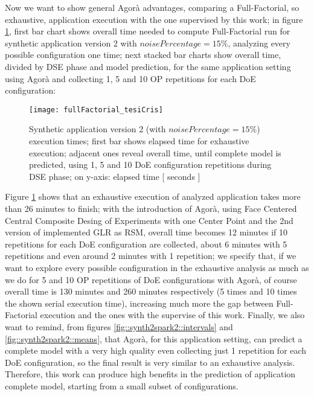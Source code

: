 Now we want to show general Agorà advantages, comparing a Full-Factorial, so exhaustive, application execution with the one supervised by this work; in figure \ref{fig::full_cris}, first bar chart shows overall time needed to compute Full-Factorial run for synthetic application version 2 with $noisePercentage = 15\%$, analyzing every possible configuration one time; next stacked bar charts show overall time, divided by DSE phase and model prediction, for the same application setting using Agorà and collecting 1, 5 and 10 OP repetitions for each DoE configuration:

\begin{figure}[h]

    \centering
    \texttt{[image: fullFactorial\_tesiCris]}
    \caption[Synthetic application version 2 execution times]{Synthetic application version 2 (with $noisePercentage = 15\%$) execution times; first bar shows elapsed time for exhaustive execution; adjacent ones reveal overall time, until complete model is predicted, using 1, 5 and 10 DoE configuration repetitions during DSE phase; on y-axis: elapsed time [ seconds ]}
    \label{fig::full_cris}
    
\end{figure}

Figure \ref{fig::full_cris} shows that an exhaustive execution of analyzed application takes more than 26 minutes to finish; with the introduction of Agorà, using Face Centered Central Composite Desing of Experiments with one Center Point and the 2nd version of implemented GLR as RSM, overall time becomes 12 minutes if 10 repetitions for each DoE configuration are collected, about 6 minutes with 5 repetitions and even around 2 minutes with 1 repetition; we specify that, if we want to explore every possible configuration in the exhaustive analysis as much as we do for 5 and 10 OP repetitions of DoE configurations with Agorà, of course overall time is 130 minutes and 260 minutes respectively (5 times and 10 times the shown serial execution time), increasing much more the gap between Full-Factorial execution and the ones with the supervise of this work. Finally, we also want to remind, from figures \ref{fig::synth2spark2::intervals} and \ref{fig::synth2spark2::means}, that Agorà, for this application setting, can predict a complete model with a very high quality even collecting just 1 repetition for each DoE configuration, so the final result is very similar to an exhaustive analysis. Therefore, this work can produce high benefits in the prediction of application complete model, starting from a small subset of configurations.


